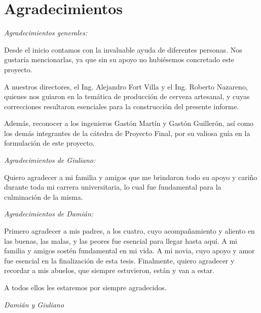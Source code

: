 \chapter{Agradecimientos}

\textit{Agradecimientos generales:}
\par Desde el inicio contamos con la invaluable ayuda de diferentes personas. Nos gustaría mencionarlas, ya que sin su apoyo no hubiésemos concretado este proyecto.

\par A nuestros directores, el Ing. Alejandro Fort Villa y el Ing. Roberto Nazareno, quienes nos guiaron en la temática de producción de cerveza artesanal, y cuyas correcciones resultaron esenciales para la construcción del presente informe.

\par Además, reconocer a los ingenieros Gastón Martín y Gastón Guillerón, así como los demás integrantes de la cátedra de Proyecto Final, por su valiosa guía en la formulación de este proyecto.

\textit{Agradecimientos de Giuliano:}
\par Quiero agradecer a mi familia y amigos que me brindaron todo su apoyo y cariño durante toda mi carrera universitaria, lo cual fue fundamental para la culminación de la misma.


\textit{Agradecimientos de Damián:}
\par Primero agradecer a mis padres, a los cuatro, cuyo acompañamiento y aliento en las buenas, las malas, y las peores fue esencial para llegar hasta aquí. A mi familia y amigos sostén fundamental en mi vida. A mi novia, cuyo apoyo y amor fue esencial en la finalización de esta tesis. Finalmente, quiero agradecer y recordar a mis abuelos, que siempre estuvieron, están y van a estar.

\par A todos ellos les estaremos por siempre agradecidos.
\begin{center}
    \textit{Damián y Giuliano}
\end{center}
